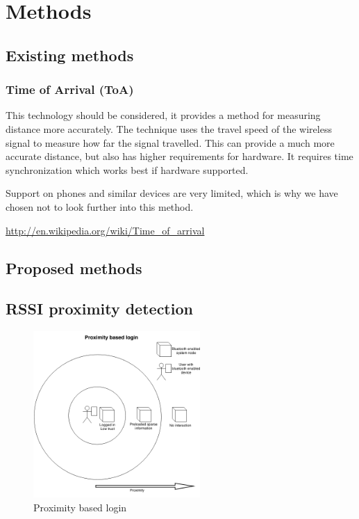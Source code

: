 	\section{Methods}

\subsection{Existing methods}

\subsubsection{Time of Arrival (ToA)} %
This technology should be considered, it provides a method for measuring distance more accurately.
The technique uses the travel speed of the wireless signal to measure how far the signal travelled.
This can provide a much more accurate distance, but also has higher requirements for hardware.
It requires time synchronization which works best if hardware supported.

Support on phones and similar devices are very limited, which is why we have chosen not to look further into this method. %

\url{http://en.wikipedia.org/wiki/Time_of_arrival}

\subsection{Proposed methods}

\subsection{RSSI proximity detection}

\begin{figure}[!t]
	\centering
	\includegraphics[width=2.5in]{img/proximityBasedLogin}
	\caption{ Proximity based login }
	\label{fig_proximity_based_login}
\end{figure}

